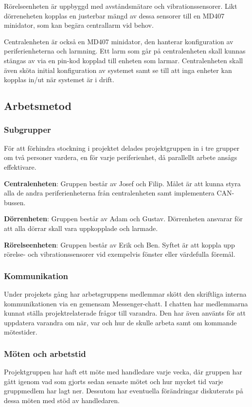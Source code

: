 \documentclass{article}
\begin{document}
Rörelseenheten är uppbyggd med avståndsmätare och vibrationssensorer. Likt dörreneheten kopplas en justerbar mängd av dessa sensorer till en MD407 minidator, som kan begära centrallarm vid behov.

Centralenheten är också en MD407 minidator, den hanterar konfiguration av periferienheterna och larmning. Ett larm som går på centralenheten skall kunnas stängas av via en pin-kod kopplad till enheten som larmar. Centralenheten skall även sköta initial konfiguration av systemet samt se till att inga enheter kan kopplas in/ut när systemet är i drift.

\subsection{Arbetsmetod} %
\subsubsection{Subgrupper}
För att förhindra stockning i projektet delades projektgruppen in i tre grupper om två personer vardera, en för varje periferienhet, då parallellt arbete ansågs effektivare.

\textbf{Centralenheten}: Gruppen består av Josef och Filip. Målet är att kunna styra alla de andra periferienheterna från centralenheten samt implementera CAN-bussen.

\textbf{Dörrenheten}: Gruppen består av Adam och Gustav. Dörrenheten ansvarar för att alla dörrar skall vara uppkopplade och larmade.

\textbf{Rörelseenheten}: Gruppen består av Erik och Ben. Syftet är att koppla upp rörelse- och vibrationssensorer vid exempelvis fönster eller värdefulla föremål.

\subsubsection{Kommunikation}
Under projekets gång har arbetsgruppens medlemmar skött den skriftliga interna kommunikationen via en gemensam Messenger-chatt.
I chatten har medlemmarna kunnat ställa projektrelaterade
frågor till varandra. Den har även använts för att uppdatera varandra om när, var och hur de skulle arbeta samt om kommande mötestider.
\subsubsection{Möten och arbetstid}
Projektgruppen har haft ett möte med handledare varje vecka, där gruppen har gått igenom vad som gjorts sedan senaste mötet och hur mycket tid varje gruppmedlem har lagt ner. Dessutom har eventuella förändringar diskuterats på dessa möten med stöd av handledaren.
\end{document}
